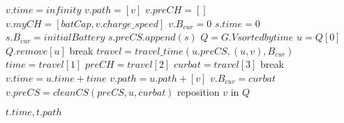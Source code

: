 \begin{algorithmic}
    		\State $v.time = infinity$
		\State $v.path = [v]$
    		\State $v.preCH = []$
		\State $v.myCH = [batCap, v.charge\_speed]$
		\State $v.B_{cur} = 0$
    	\EndFor
	\State $s.time = 0$
	\State $s.B_{cur} = initialBattery$
	\State $s.preCS.append(s)$	
	\State $Q = G.V sorted by time$
		\State $u = Q[0]$
		\State $Q.remove[u]$
		 break \EndIf
			\State $travel = travel\_time(u.preCS, (u, v), B_{cur})$
			\State $time = travel[1]$
			\State $preCH = travel[2]$
			\State $curbat = travel[3]$
			 break \EndIf
				\State $v.time = u.time + time$
				\State $v.path = u.path + [v]$
				\State $v.B_{cur} = curbat$
				\State $v.preCS = cleanCS(preCS, u, curbat)$
				\State reposition $v$ in $Q$
			\EndIf

		\EndFor
	\EndWhile
	\State \Return $t.time, t.path$
\EndFunction
\end{algorithmic}\label{alg:fastest_path}
